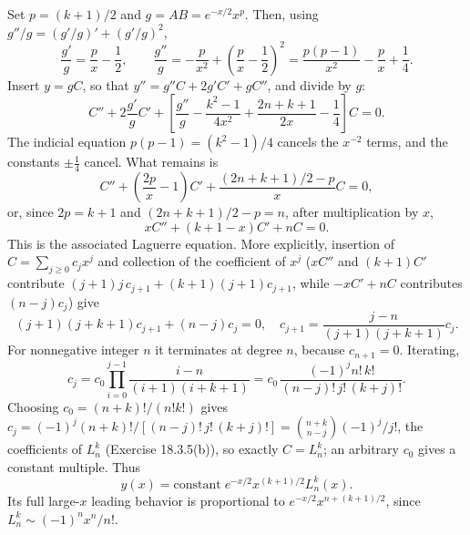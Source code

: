 Set $p=(k+1)/2$ and $g=AB=e^{-x/2}x^p$.  Then, using
$g''/g=(g'/g)'+(g'/g)^2$,
\[
\frac{g'}g=\frac px-\frac12,
\qquad \frac{g''}g=-\frac p{x^2}+\left(\frac px-\frac12\right)^2
 =\frac{p(p-1)}{x^2}-\frac px+\frac14.
\]
Insert $y=gC$, so that $y''=g''C+2g'C'+gC''$, and divide by $g$:
\[
C''+2\frac{g'}gC'
 +\left[\frac{g''}g-\frac{k^2-1}{4x^2}+\frac{2n+k+1}{2x}-\frac14\right]C=0.
\]
The indicial equation $p(p-1)=(k^2-1)/4$ cancels the $x^{-2}$ terms,
and the constants $\pm\frac14$ cancel.  What remains is
\[
C''+\left(\frac{2p}{x}-1\right)C'
 +\frac{(2n+k+1)/2-p}{x}C=0,
\]
or, since $2p=k+1$ and $(2n+k+1)/2-p=n$, after multiplication by $x$,
\[
xC''+(k+1-x)C'+nC=0.
\]
This is the associated Laguerre equation.  More explicitly, insertion
of $C=\sum_{j\ge0}c_jx^j$ and collection of the coefficient of $x^j$
($xC''$ and $(k+1)C'$ contribute $(j+1)j\,c_{j+1}+(k+1)(j+1)c_{j+1}$,
while $-xC'+nC$ contributes $(n-j)c_j$) give
\[
(j+1)(j+k+1)c_{j+1}+(n-j)c_j=0,
\quad
c_{j+1}=\frac{j-n}{(j+1)(j+k+1)}c_j.
\]
For nonnegative integer $n$ it terminates at degree $n$, because
$c_{n+1}=0$.  Iterating,
\[
c_j=c_0\prod_{i=0}^{j-1}\frac{i-n}{(i+1)(i+k+1)}
 =c_0\,\frac{(-1)^jn!\,k!}{(n-j)!\,j!\,(k+j)!}.
\]
Choosing $c_0=(n+k)!/(n!k!)$ gives
$c_j=(-1)^j(n+k)!/[(n-j)!\,j!\,(k+j)!]=\binom{n+k}{n-j}(-1)^j/j!$,
the coefficients of $L_n^k$ (Exercise 18.3.5(b)), so exactly $C=L_n^k$;
an arbitrary $c_0$ gives a constant multiple.  Thus
\[
\boxed{y(x)=\text{constant}\;e^{-x/2}x^{(k+1)/2}L_n^k(x)}.
\]
Its full large-$x$ leading behavior is proportional to
$e^{-x/2}x^{n+(k+1)/2}$, since $L_n^k\sim(-1)^nx^n/n!$.

